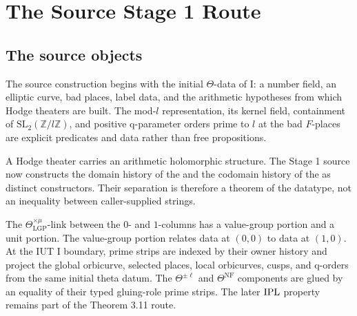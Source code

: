 \chapter{The Source Stage 1 Route}
\label{ch:stage1-source}

\section{The source objects}

\begin{definition}
  \label{def:initial-theta-data}
  \leanok
  The source construction begins with the initial \(\Theta\)-data of \IUT{} I:
  a number field, an elliptic curve, bad places, label data, and the
  arithmetic hypotheses from which Hodge theaters are built.  The mod-\(l\)
  representation, its kernel field, containment of
  \(\mathrm{SL}_2(\mathbb Z/l\mathbb Z)\), and positive q-parameter orders
  prime to \(l\) at the bad \(F\)-places are explicit predicates and data
  rather than free propositions.
\end{definition}

\begin{definition}
  \label{def:hodge-theater-histories}
  \leanok
  A Hodge theater carries an arithmetic holomorphic structure.  The Stage 1
  source now constructs the domain history of the \qPilot{} and the
  codomain history of the \ThetaPilot{} as distinct constructors.  Their
  separation is therefore a theorem of the datatype, not an inequality between
  caller-supplied strings.
\end{definition}

\begin{definition}
  \label{def:prime-strip-links}
  \leanok
  The \(\Theta^{\times\mu}_{\mathrm{LGP}}\)-link between the \(0\)- and
  \(1\)-columns has a value-group portion and a unit portion.  The value-group
  portion relates \qPilot{} data at \((0,0)\) to \ThetaPilot{} data at
  \((1,0)\).  At the IUT I boundary, prime strips are indexed by their owner
  history and project the global orbicurve, selected places, local orbicurves,
  cusps, and q-orders from the same initial theta datum.  The
  \(\Theta^{\pm\ell}\) and \(\Theta^{\mathrm{NF}}\) components are glued by an
  equality of their typed gluing-role prime strips.  The later \(\mathrm{IPL}\)
  property remains part of the Theorem 3.11 route.
\end{definition}

